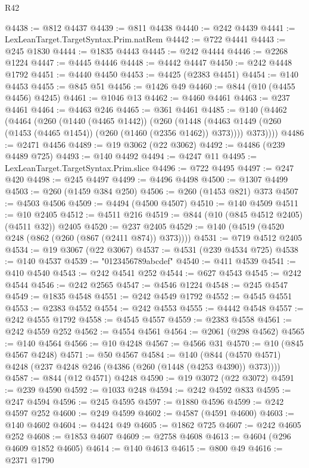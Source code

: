 \begin{lexlean}{R42}
\begin{coremodule}
{@4438 := @812 @4437
@4439 := @811 @4438
@4440 := @242 @4439
@4441 := LexLeanTarget.TargetSyntax.Prim.natRem
@4442 := @722 @4441
@4443 := @245 @1830
@4444 := @1835 @4443
@4445 := @242 @4444
@4446 := @2268 @1224
@4447 := @4445 @4446
@4448 := @4442 @4447
@4450 := @242 @4448 @1792
@4451 := @4440 @4450
@4453 := @4425 (@2383 @4451)
@4454 := @140 @4453
@4455 := @845 @51
@4456 := @1426 @49
@4460 := @844 (@10 (@4455 @4456) @4245)
@4461 := @1046 @13
@4462 := @4460 @4461
@4463 := @237 @4461
@4464 := @4463 @246
@4465 := @361 @4461
@4485 := @140
    (@4462
      (@4464
        (@260
          (@1440 (@4465 @1442))
          (@260
            (@1448 (@4463 @1449 (@260 (@1453 (@4465 @1454)) (@260 (@1460 (@2356 @1462)) @373))))
            @373))))
@4486 := @2471 @4456
@4489 := @19 @3062 (@22 @3062)
@4492 := @4486 (@239 @4489 @725)
@4493 := @140 @4492
@4494 := @4247 @11
@4495 := LexLeanTarget.TargetSyntax.Prim.slice
@4496 := @722 @4495
@4497 := @247 @420
@4498 := @245 @4497
@4499 := @4496 @4498
@4500 := @1307 @4499
@4503 := @260 (@1459 @384 @250)
@4506 := @260 (@1453 @821) @373
@4507 := @4503 @4506
@4509 := @4494 (@4500 @4507)
@4510 := @140 @4509
@4511 := @10 @2405
@4512 := @4511 @216
@4519 := @844 (@10 (@845 @4512 @2405) (@4511 @32)) @2405
@4520 := @237 @2405
@4529 := @140 (@4519 (@4520 @248 (@862 (@260 (@867 (@2411 @874)) @373))))
@4531 := @719 @4512 @2405
@4534 := @19 @3067 (@22 @3067)
@4537 := @4531 (@239 @4534 @725)
@4538 := @140 @4537
@4539 := "0123456789abcdef"
@4540 := @411 @4539
@4541 := @410 @4540
@4543 := @242 @4541 @252
@4544 := @627 @4543
@4545 := @242 @4544
@4546 := @242 @2565
@4547 := @4546 @1224
@4548 := @245 @4547
@4549 := @1835 @4548
@4551 := @242 @4549 @1792
@4552 := @4545 @4551
@4553 := @2383 @4552
@4554 := @242 @4553
@4555 := @4442 @4548
@4557 := @242 @4555 @1792
@4558 := @4545 @4557
@4559 := @2383 @4558
@4561 := @242 @4559 @252
@4562 := @4554 @4561
@4564 := @2061 (@298 @4562)
@4565 := @140 @4564
@4566 := @10 @4248
@4567 := @4566 @31
@4570 := @10 (@845 @4567 @4248)
@4571 := @50 @4567
@4584 := @140 (@844 (@4570 @4571) @4248 (@237 @4248 @246 (@4386 (@260 (@1448 (@4253 @4390)) @373))))
@4587 := @844 (@12 @4571) @4248
@4590 := @19 @3072 (@22 @3072)
@4591 := @239 @4590
@4592 := @1033 @248
@4594 := @242 @4592 @833
@4595 := @247 @4594
@4596 := @245 @4595
@4597 := @1880 @4596
@4599 := @242 @4597 @252
@4600 := @249 @4599
@4602 := @4587 (@4591 @4600)
@4603 := @140 @4602
@4604 := @4424 @49
@4605 := @1862 @725
@4607 := @242 @4605 @252
@4608 := @1853 @4607
@4609 := @2758 @4608
@4613 := @4604 (@296 @4609 @1852 @4605)
@4614 := @140 @4613
@4615 := @800 @49
@4616 := @2371 @1790
}
\end{coremodule}
\end{lexlean}
